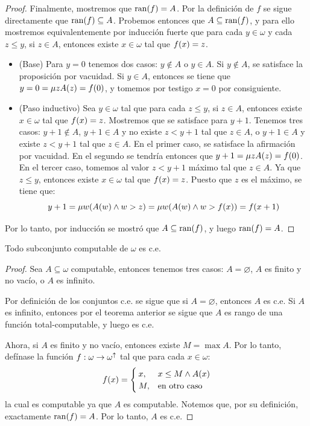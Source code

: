 \begin{proof}
	Finalmente, mostremos que $\RANGO{f} = A$. Por la definición de $f$ se sigue directamente que $\RANGO{f}\subseteq A$. Probemos entonces que $A\subseteq\RANGO{f}$, y para ello mostremos equivalentemente por inducción fuerte que para cada $y\in\omega$ y cada $z\leq y$, si $z\in A$, entonces existe $x\in\omega$ tal que $f\pa*{x} = z$.

	\begin{itemize}
		\item (Base) Para $y = 0$ tenemos dos casos: $y\notin A$ o $y\in A$. Si $y\notin A$, se satisface la proposición por vacuidad. Si $y\in A$, entonces se tiene que $y = 0 =\mu z A\pa*{z} = f\pa*{0}$, y tomemos por testigo $x = 0$ por consiguiente.

		\item (Paso inductivo) Sea $y\in\omega$ tal que para cada $z\leq y$, si $z\in A$, entonces existe $x\in\omega$ tal que $f\pa*{x} = z$. Mostremos que se satisface para $y + 1$. Tenemos tres casos: $y + 1\notin A$, $y + 1\in A$ y no existe $z < y + 1$ tal que $z\in A$, o $y + 1\in A$ y existe $z < y + 1$ tal que $z\in A$. En el primer caso, se satisface la afirmación por vacuidad. En el segundo se tendría entonces que $y + 1 =\mu z A\pa*{z} = f\pa*{0}$. En el tercer caso, tomemos al valor $z < y + 1$ máximo tal que $z\in A$. Ya que $z\leq y$, entonces existe $x\in\omega$ tal que $f\pa*{x} = z$. Puesto que $z$ es el máximo, se tiene que:
		\[
			y + 1 =\mu w\pa*{A\pa*{w}\land w > z} =\mu w\pa*{A\pa*{w}\land w > f\pa*{x}} = f\pa*{x + 1}
		\]
	\end{itemize}

	Por lo tanto, por inducción se mostró que $A\subseteq\RANGO{f}$, y luego $\RANGO{f} = A$.
\end{proof}

\begin{coll}
	\label{coll: computable_es_ce} %
	Todo subconjunto computable de $\omega$ es c.e.
\end{coll}

\begin{proof}
	Sea $A\subseteq\omega$ computable, entonces tenemos tres casos: $A =\varnothing$, $A$ es finito y no vacío, o $A$ es infinito.

	Por definición de los conjuntos c.e. se sigue que si $A =\varnothing$, entonces $A$ es c.e. Si $A$ es infinito, entonces por el teorema anterior se sigue que $A$ es rango de una función total-computable, y luego es c.e.

	Ahora, si $A$ es finito y no vacío, entonces existe $M =\max A$. Por lo tanto, defínase la función $f:\omega\to\omega^{\uparrow}$ tal que para cada $x\in\omega$:
	\[
		f\pa*{x} =
		\begin{cases}
			x, & x\leq M\land A\pa*{x}\\
			M, &\text{en otro caso}
		\end{cases}
	\]
	la cual es computable ya que $A$ es computable. Notemos que, por su definición, exactamente $\RANGO{f} = A$. Por lo tanto, $A$ es c.e.
\end{proof}

